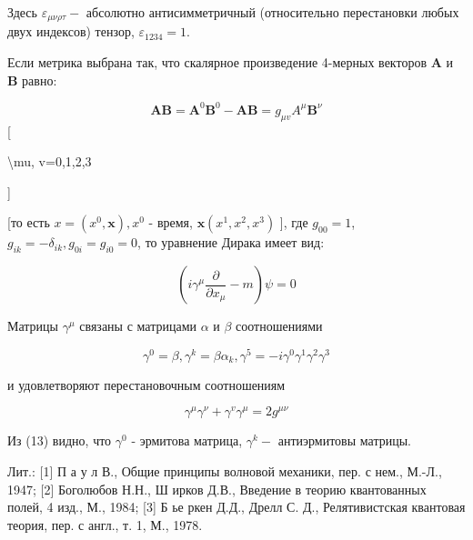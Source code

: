 \documentclass[10pt]{article}
\begin{document}
Здесь $\varepsilon_{\mu \nu \rho \tau}-$ абсолютно антисимметричный (относительно перестановки любых двух индексов) тензор, $\varepsilon_{1234}=1$.



Если метрика выбрана так, что скалярное произведение 4-мерных векторов $\boldsymbol{A}$ и $\boldsymbol{B}$ равно:



\[

\boldsymbol{A B}=\boldsymbol{A}^{0} \boldsymbol{B}^{0}-\boldsymbol{A B}=g_{\mu v} A^{\mu} \boldsymbol{B}^{\nu}

\][



\textbackslash mu, v=0,1,2,3

]



[то есть $x=\left(x^{0}, \boldsymbol{x}\right), x^{0}$ - время, $\boldsymbol{x}\left(x^{1}, x^{2}, x^{3}\right)$ ], где $g_{00}=1$, $g_{i k}=-\delta_{i k}, g_{0 i}=g_{i 0}=0$, то уравнение Дирака имеет вид:



\[

\left(i \gamma^{\mu} \frac{\partial}{\partial x_{\mu}}-m\right) \psi=0

\]



Матрицы $\gamma^{\mu}$ связаны с матрицами $\alpha$ и $\beta$ соотношениями



\[

\gamma^{0}=\beta, \gamma^{k}=\beta \alpha_{k}, \gamma^{5}=-i \gamma^{0} \gamma^{1} \gamma^{2} \gamma^{3}

\]



и удовлетворяют перестановочным соотношениям



\[

\gamma^{\mu} \gamma^{\nu}+\gamma^{v} \gamma^{\mu}=2 g^{\mu \nu}

\]



Из (13) видно, что $\gamma^{0}$ - эрмитова матрица, $\gamma^{k}-$ антиэрмитовы матрицы.



Лит.: [1] П а у л В., Общие принципы волновой механики, пер. с нем., М.-Л., 1947; [2] Боголюбов Н.Н., Ш ирков Д.В., Введение в теорию квантованных полей, 4 изд., М., 1984; [3] Б ье ркен Д.Д., Дрелл С. Д., Релятивистская квантовая теория, пер. с англ., т. 1, М., 1978.
\end{document}
